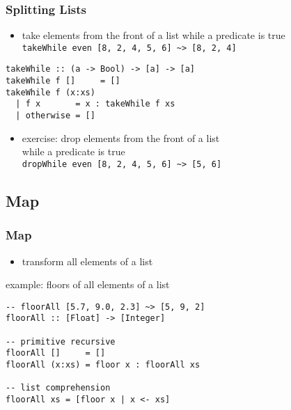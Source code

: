 \documentclass[dvipsnames]{beamer}
\theoremstyle{plain}
\begin{document}
\begin{frame}[fragile]
  \frametitle{Splitting Lists}

  \begin{itemize}
    \item take elements from the front of a list while a predicate is true\\
      \lstinline|takeWhile even [8, 2, 4, 5, 6] ~> [8, 2, 4]|
  \end{itemize}

  \begin{exampleblock}{}
    \begin{lstlisting}[deletekeywords={takeWhile}]
takeWhile :: (a -> Bool) -> [a] -> [a]
takeWhile f []     = []
takeWhile f (x:xs)
  | f x       = x : takeWhile f xs
  | otherwise = []
    \end{lstlisting}
  \end{exampleblock}

  \pause
  \begin{itemize}
    \item exercise: drop elements from the front of a list\\
      while a predicate is true\\
      \lstinline|dropWhile even [8, 2, 4, 5, 6] ~> [5, 6]|
  \end{itemize}
\end{frame}

\subsection{Map}

\begin{frame}[fragile]
  \frametitle{Map}

  \begin{itemize}
    \item transform all elements of a list
  \end{itemize}

  \begin{exampleblock}{example: floors of all elements of a list}
    \begin{lstlisting}
-- floorAll [5.7, 9.0, 2.3] ~> [5, 9, 2]
floorAll :: [Float] -> [Integer]

-- primitive recursive
floorAll []     = []
floorAll (x:xs) = floor x : floorAll xs

-- list comprehension
floorAll xs = [floor x | x <- xs]
    \end{lstlisting}
  \end{exampleblock}
\end{frame}
\end{document}
